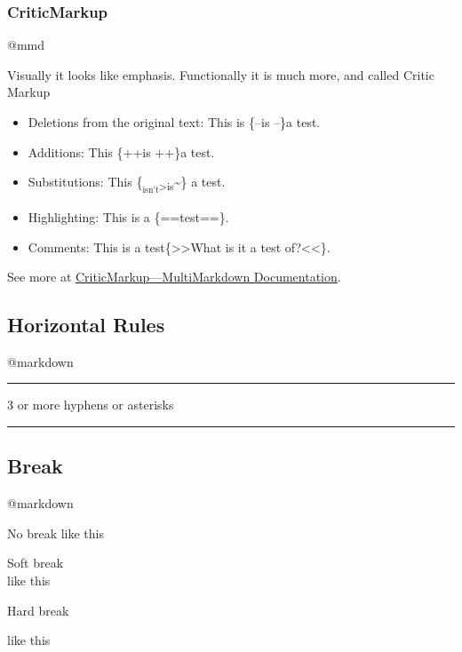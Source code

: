 \documentclass[]{article}
\providecommand{\tightlist}{%
  \setlength{\itemsep}{0pt}\setlength{\parskip}{0pt}}
\begin{document}
\subsubsection{CriticMarkup}\label{criticmarkup}

@mmd

Visually it looks like emphasis. Functionally it is much more, and
called Critic Markup

\begin{itemize}
\tightlist
\item
  Deletions from the original text: This is \{--is --\}a test.
\item
  Additions: This \{++is ++\}a test.
\item
  Substitutions: This
  \{\textsubscript{\textsubscript{isn't}\textgreater{}is}\textasciitilde{}\}
  a test.
\item
  Highlighting: This is a \{==test==\}.
\item
  Comments: This is a test\{\textgreater{}\textgreater{}What is it a
  test of?\textless{}\textless{}\}.
\end{itemize}

See more at
\href{http://fletcher.github.io/MultiMarkdown-5/criticmarkup.html}{CriticMarkup---MultiMarkdown
Documentation}.

\subsection{Horizontal Rules}\label{horizontal-rules}

@markdown

\begin{center}\rule{0.5\linewidth}{\linethickness}\end{center}

3 or more hyphens or asterisks

\begin{center}\rule{0.5\linewidth}{\linethickness}\end{center}

\subsection{Break}\label{break}

@markdown

No break like this

Soft break\\
like this

Hard break

like this
\end{document}
